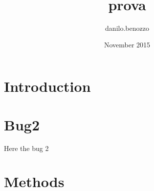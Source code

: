 \documentclass{article}
\title{prova}
\author{danilo.benozzo }
\date{November 2015}
\begin{document}
\maketitle

\section{Introduction}


\section{Bug2}
Here the bug 2

\section{Methods}
\end{document}
